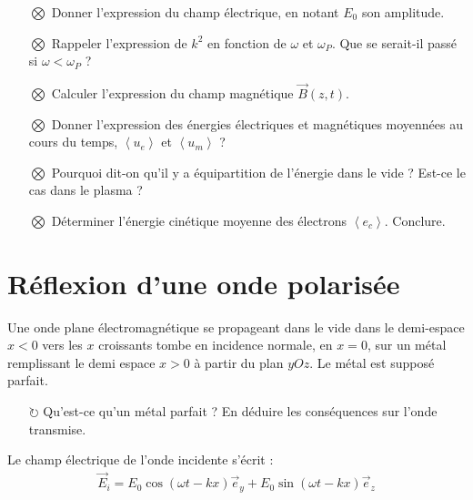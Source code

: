 \documentclass{report}
\begin{document}
\begin{itemize}

	\item[$\bigotimes$] Donner l'expression du champ électrique, en notant $E_0$ son amplitude.
	
	\item[$\bigotimes$] Rappeler l'expression de $k^2$ en fonction de $\omega$ et $\omega_P$. Que se serait-il passé si $\omega<\omega_P$ ? 
	
	\item[$\bigotimes$] Calculer l'expression du champ magnétique $\vec{B}(z,t)$. 
	
	\item[$\bigotimes$] Donner l'expression des énergies électriques et magnétiques moyennées au cours du temps, $\left\langle u_e\right\rangle $ et $\left\langle u_m\right\rangle $ ?
	
	\item[$\bigotimes$] Pourquoi dit-on qu'il y a équipartition de l'énergie dans le vide ? Est-ce le cas dans le plasma ?
	
	\item[$\bigotimes$] Déterminer l'énergie cinétique moyenne des électrons $\left\langle e_c \right\rangle$. Conclure.
	
\end{itemize}

\newpage

\section*{Réflexion d'une onde polarisée}

Une onde plane électromagnétique se propageant dans le vide dans le demi-espace $x<0$ vers les $x$ croissants tombe en incidence normale, en $x=0$, sur un métal remplissant le demi espace $x>0$ à partir du plan $yOz$. Le métal est supposé parfait.

\begin{itemize}

	\item[$\circlearrowright$] Qu'est-ce qu'un métal parfait ? En déduire les conséquences sur l'onde transmise. 

\end{itemize}

Le champ électrique de l'onde incidente s'écrit :
\begin{align*}
	\vec{E}_i=E_0\cos(\omega t -kx)\vec{e}_y+E_0\sin(\omega t -kx)\vec{e}_z
\end{align*}
\end{document}

